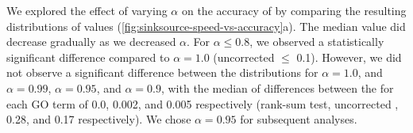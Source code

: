 We explored the effect of varying $\alpha$ on the accuracy of \sinksource by comparing the resulting distributions of \fmax values (\cref{fig:sinksource-speed-vs-accuracy}a). 
The median \fmax value did decrease gradually as we decreased $\alpha$. 
For $\alpha \leq 0.8$, we observed a statistically significant difference compared to $\alpha = 1.0$ (uncorrected \pval $\leq$ 0.1).
However, we did not observe a significant difference between the distributions for $\alpha = 1.0$, and $\alpha = 0.99$, $\alpha = 0.95$, and $\alpha = 0.9$, with the median of differences between the \fmax for each GO term of 0.0, 0.002, and 0.005 respectively (rank-sum test, uncorrected , 0.28, and 0.17 respectively).
We chose $\alpha = 0.95$ for subsequent analyses.  


